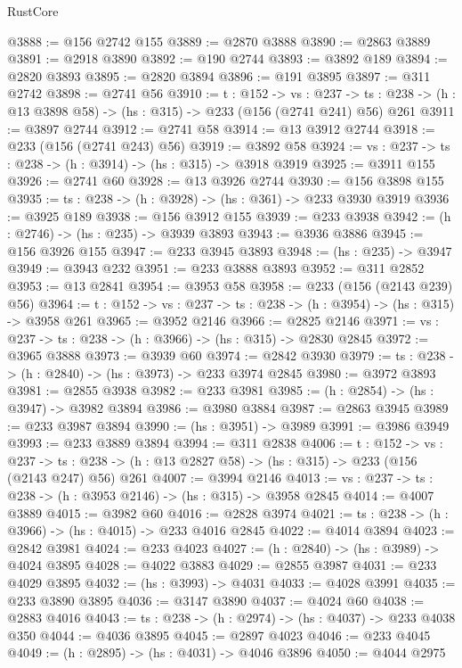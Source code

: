 \begin{lexlean}{RustCore}
\begin{coremodule}
@3888 := @156 @2742 @155
@3889 := @2870 @3888
@3890 := @2863 @3889
@3891 := @2918 @3890
@3892 := @190 @2744
@3893 := @3892 @189
@3894 := @2820 @3893
@3895 := @2820 @3894
@3896 := @191 @3895
@3897 := @311 @2742
@3898 := @2741 @56
@3910 := {t : @152} ->
  {vs : @237} ->
  {ts : @238} -> (h : @13 @3898 @58) -> (hs : @315) -> @233 (@156 (@2741 @241) @56) @261
@3911 := @3897 @2744
@3912 := @2741 @58
@3914 := @13 @3912 @2744
@3918 := @233 (@156 (@2741 @243) @56)
@3919 := @3892 @58
@3924 := {vs : @237} -> {ts : @238} -> (h : @3914) -> (hs : @315) -> @3918 @3919
@3925 := @3911 @155
@3926 := @2741 @60
@3928 := @13 @3926 @2744
@3930 := @156 @3898 @155
@3935 := {ts : @238} -> (h : @3928) -> (hs : @361) -> @233 @3930 @3919
@3936 := @3925 @189
@3938 := @156 @3912 @155
@3939 := @233 @3938
@3942 := (h : @2746) -> (hs : @235) -> @3939 @3893
@3943 := @3936 @3886
@3945 := @156 @3926 @155
@3947 := @233 @3945 @3893
@3948 := (hs : @235) -> @3947
@3949 := @3943 @232
@3951 := @233 @3888 @3893
@3952 := @311 @2852
@3953 := @13 @2841
@3954 := @3953 @58
@3958 := @233 (@156 (@2143 @239) @56)
@3964 := {t : @152} -> {vs : @237} -> {ts : @238} -> (h : @3954) -> (hs : @315) -> @3958 @261
@3965 := @3952 @2146
@3966 := @2825 @2146
@3971 := {vs : @237} -> {ts : @238} -> (h : @3966) -> (hs : @315) -> @2830 @2845
@3972 := @3965 @3888
@3973 := @3939 @60
@3974 := @2842 @3930
@3979 := {ts : @238} -> (h : @2840) -> (hs : @3973) -> @233 @3974 @2845
@3980 := @3972 @3893
@3981 := @2855 @3938
@3982 := @233 @3981
@3985 := (h : @2854) -> (hs : @3947) -> @3982 @3894
@3986 := @3980 @3884
@3987 := @2863 @3945
@3989 := @233 @3987 @3894
@3990 := (hs : @3951) -> @3989
@3991 := @3986 @3949
@3993 := @233 @3889 @3894
@3994 := @311 @2838
@4006 := {t : @152} ->
  {vs : @237} ->
  {ts : @238} -> (h : @13 @2827 @58) -> (hs : @315) -> @233 (@156 (@2143 @247) @56) @261
@4007 := @3994 @2146
@4013 := {vs : @237} -> {ts : @238} -> (h : @3953 @2146) -> (hs : @315) -> @3958 @2845
@4014 := @4007 @3889
@4015 := @3982 @60
@4016 := @2828 @3974
@4021 := {ts : @238} -> (h : @3966) -> (hs : @4015) -> @233 @4016 @2845
@4022 := @4014 @3894
@4023 := @2842 @3981
@4024 := @233 @4023
@4027 := (h : @2840) -> (hs : @3989) -> @4024 @3895
@4028 := @4022 @3883
@4029 := @2855 @3987
@4031 := @233 @4029 @3895
@4032 := (hs : @3993) -> @4031
@4033 := @4028 @3991
@4035 := @233 @3890 @3895
@4036 := @3147 @3890
@4037 := @4024 @60
@4038 := @2883 @4016
@4043 := {ts : @238} -> (h : @2974) -> (hs : @4037) -> @233 @4038 @350
@4044 := @4036 @3895
@4045 := @2897 @4023
@4046 := @233 @4045
@4049 := (h : @2895) -> (hs : @4031) -> @4046 @3896
@4050 := @4044 @2975

\end{coremodule}
\end{lexlean}

